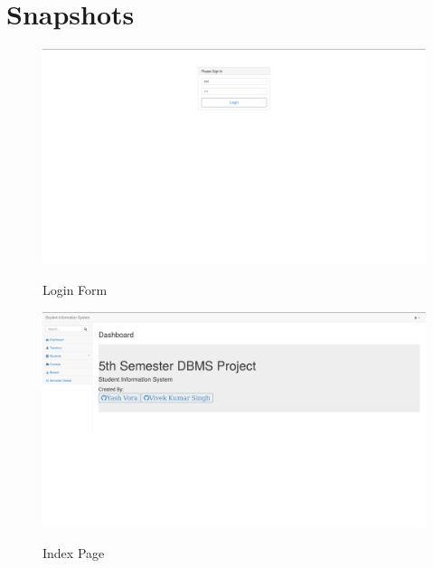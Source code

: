 \chapter{Snapshots}

\begin{figure}[H]
\centering
\caption{Login Form}
\includegraphics[width=\textwidth,height=\textheight,keepaspectratio]{./snaps/1.png}
\\[0.2in]
\label{fig:Login Form}
\end{figure}

\begin{figure}[H]
\centering
\caption{Index Page}
\includegraphics[width=\textwidth,height=\textheight,keepaspectratio]{./snaps/2.png}
\\[0.2in]
\label{fig:Index Page}
\end{figure}

